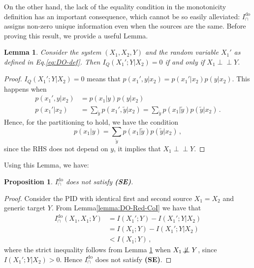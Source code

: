 \documentclass{article}
\newcommand{\ind}{\mathrel{\perp\!\!\!\perp}}
\newcommand{\notind}{\mathrel{\not\!\perp\!\!\!\perp}}
\newcommand{\SE}{\textbf{(SE)}\xspace} %
\newcommand{\Ido}{\ensuremath{I_\cap^{\text{do}}}\xspace}
\newtheorem{lemma}{Lemma}
\newtheorem{proposition}{Proposition}
\begin{document}
On the other hand, the lack of the equality condition in the monotonicity definition has an important consequence, which cannot be so easily alleviated: \Ido assigns non-zero unique information even when the sources are the same. Before proving this result, we provide a useful Lemma.
\begin{lemma} \label{lemma:DO-zeroIc}
    Consider the system $(X_1,X_2,Y)$ and the random variable $X_1'$ as defined in Eq.\eqref{eq:DO-def}. Then $I_Q(X_1';Y|X_2)=0$ if and only if $X_1\ind Y$.
\end{lemma}
\begin{proof}
    $I_Q(X_1';Y|X_2)=0$ means that $p(x_1',y|x_2)=p(x_1'|x_2)p(y|x_2)$. This happens when
\begin{align}
    p(x_1',y|x_2) & = p(x_1|y)p(y|x_2) \\
    p(x_1'|x_2) & = \sum_{\tilde{y}} p(x_1',\tilde{y}|x_2) = \sum_{\tilde{y}} p(x_1|\tilde{y})p(\tilde{y}|x_2) \,.
\end{align}
    Hence, for the partitioning to hold, we have the condition
    \begin{equation}
        p(x_1|y) = \sum_{\tilde{y}} p(x_1|\tilde{y})p(\tilde{y}|x_2) \,,
    \end{equation}
    since the RHS does not depend on $y$, it implies that $X_1\ind Y$. 
\end{proof}


Using this Lemma, we have:
\begin{proposition} \label{prop:DO-noSE}
    $\Ido$ does not satisfy \SE.
\end{proposition}
\begin{proof}
    Consider the PID with identical first and second source $X_1=X_2$ and generic target $Y$. From Lemma\ref{lemma:DO-Red-CoI} we have that
    \begin{equation}
        \begin{aligned}
            \Ido(X_1,X_1;Y) & = I(X_1';Y) - I(X_1';Y|X_2) \\
         & = I(X_1;Y) - I(X_1';Y|X_2) \\
         & < I(X_1;Y) \,,
        \end{aligned}
    \end{equation}
    where the strict inequality follows from Lemma \ref{lemma:DO-zeroIc} when $X_1\notind Y$, since $I(X_1';Y|X_2)>0$. 
    Hence $\Ido$ does not satisfy \SE.
\end{proof}
\end{document}
